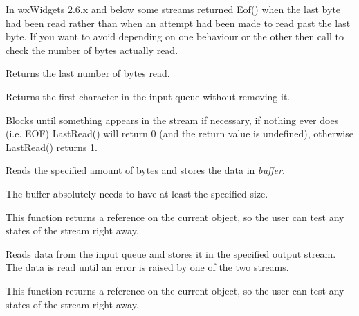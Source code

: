 In wxWidgets 2.6.x and below some streams returned Eof() when the last
byte had been read rather than when an attempt had been made to read
past the last byte. If you want to avoid depending on one behaviour or
the other then call  to
check the number of bytes actually read.

\label{wxinputstreamlastread}


Returns the last number of bytes read.

\label{wxinputstreampeek}


Returns the first character in the input queue without removing it.


Blocks until something appears in the stream if necessary, if nothing
ever does (i.e. EOF) LastRead() will return 0 (and the return value is
undefined), otherwise LastRead() returns 1.

\label{wxinputstreamread}


Reads the specified amount of bytes and stores the data in {\it buffer}.


The buffer absolutely needs to have at least the specified size.


This function returns a reference on the current object, so the user can test
any states of the stream right away.


Reads data from the input queue and stores it in the specified output stream.
The data is read until an error is raised by one of the two streams.


This function returns a reference on the current object, so the user can test
any states of the stream right away.

\label{wxinputstreamseeki}


